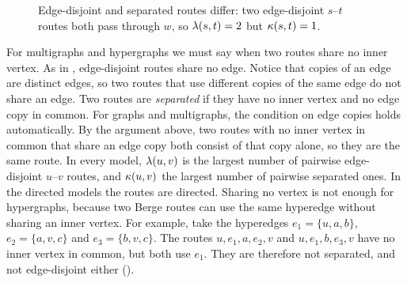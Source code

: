 \begin{figure}[ht]
\centering
{}
\caption{Edge-disjoint and separated routes differ: two edge-disjoint $s$--$t$ routes both pass through $w$, so $\lambda(s,t)=2$ but $\kappa(s,t)=1$.}
\label{fig:edge-vs-vertex}
\end{figure}

For multigraphs and hypergraphs we must say when two routes share no inner vertex.
As in , edge-disjoint routes share no edge.
Notice that copies of an edge are distinct edges, so two routes that use different copies of the same edge do not share an edge.
Two routes are \emph{separated} if they have no inner vertex and no edge copy in common.
For graphs and multigraphs, the condition on edge copies holds automatically. By the argument above, two routes with no inner vertex in common that share an edge copy both consist of that copy alone, so they are the same route.
In every model, $\lambda(u,v)$ is the largest number of pairwise edge-disjoint $u$--$v$ routes, and $\kappa(u,v)$ the largest number of pairwise separated ones. In the directed models the routes are directed.
Sharing no vertex is not enough for hypergraphs, because two Berge routes can use the same hyperedge without sharing an inner vertex.
For example, take the hyperedges $e_1=\{u,a,b\}$, $e_2=\{a,v,c\}$ and $e_3=\{b,v,c\}$. The routes $u,e_1,a,e_2,v$ and $u,e_1,b,e_3,v$ have no inner vertex in common, but both use $e_1$. They are therefore not separated, and not edge-disjoint either ().

